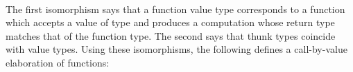 \begin{code}%
\>[6][@{}l@{\AgdaIndent{1}}]%
\>[8]%
\>[15]\AgdaSymbol{:}\AgdaSpace{}%
\AgdaSymbol{\{}\AgdaSpace{}%
\AgdaSpace{}%
\AgdaSymbol{:}\AgdaSpace{}%
\AgdaSymbol{\}}%
\>[33]\AgdaSpace{}%
\AgdaSpace{}%
\AgdaSpace{}%
\AgdaSpace{}%
%
\>[46]%
\>[51]%
\>[55]\AgdaSymbol{(}\AgdaSpace{}%
\AgdaSpace{}%
\AgdaSpace{}%
\AgdaSpace{}%
\AgdaSpace{}%
\AgdaSpace{}%
\AgdaSpace{}%
\AgdaSpace{}%
\AgdaSymbol{)}\<%
\\
%
\>[8]%
\>[15]\AgdaSymbol{:}\AgdaSpace{}%
\AgdaSymbol{\{}\AgdaSpace{}%
\AgdaSymbol{:}\AgdaSpace{}%
\AgdaSymbol{\}}%
\>[33]\AgdaSpace{}%
\AgdaSpace{}%
\AgdaSpace{}%
%
\>[46]%
\>[51]%
\>[55]\AgdaSpace{}%
\AgdaSpace{}%
\<%
\end{code}
%
The first isomorphism says that a function value type corresponds to a function which accepts a value of type  and produces a computation whose return type matches that of the function type.
The second says that thunk types coincide with value types.
Using these isomorphisms, the following defines a call-by-value elaboration of functions:
%

